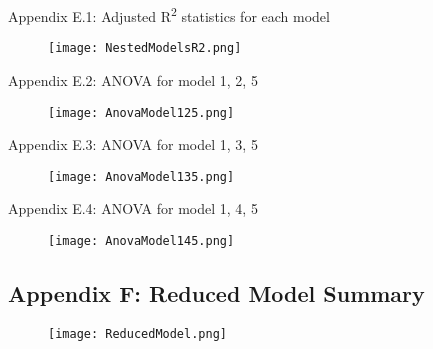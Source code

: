 \documentclass[a4paper, 12pt]{article}
\begin{document}
\begin{spacing}{1.5}
Appendix E.1: Adjusted R\textsuperscript{2} statistics for each model

\begin{figure}[h]
    \texttt{[image: NestedModelsR2.png]}
\end{figure}

Appendix E.2: ANOVA for model 1, 2, 5

\begin{figure}[h]
    \texttt{[image: AnovaModel125.png]}
\end{figure}

Appendix E.3: ANOVA for model 1, 3, 5

\begin{figure}[h]
    \texttt{[image: AnovaModel135.png]}
\end{figure}

Appendix E.4: ANOVA for model 1, 4, 5

\begin{figure}[h]
    \texttt{[image: AnovaModel145.png]}
\end{figure}

\newpage
\subsection{Appendix F: Reduced Model Summary}

\begin{figure}[h]
    \texttt{[image: ReducedModel.png]}
\end{figure}

\end{spacing}
\end{document}

